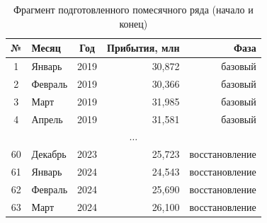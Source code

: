 \begin{table}[h!]
\caption{Фрагмент подготовленного помесячного ряда (начало и конец)}
\label{tab:short}
\centering
\begin{tabular}{c l c r r}
\toprule
№ & Месяц     & Год  & Прибытия, млн & Фаза \\
\midrule
1  & Январь   & 2019 & 30,872 & базовый  \\
2  & Февраль  & 2019 & 30,366 & базовый  \\
3  & Март     & 2019 & 31,985 & базовый  \\
4  & Апрель   & 2019 & 31,581 & базовый  \\
\multicolumn{5}{c}{$\dots$} \\
60 & Декабрь  & 2023 & 25,723 & восстановление \\
61 & Январь   & 2024 & 24,543 & восстановление \\
62 & Февраль  & 2024 & 25,690 & восстановление \\
63 & Март     & 2024 & 26,100 & восстановление \\
\bottomrule
\end{tabular}
\end{table}
